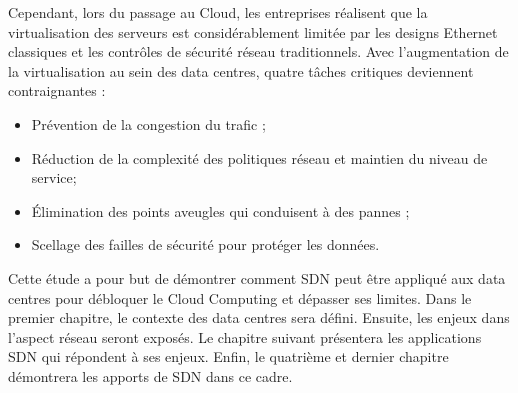 \par
Cependant, lors du passage au Cloud, les entreprises réalisent que la virtualisation des serveurs est considérablement limitée par les designs Ethernet classiques et les contrôles de sécurité réseau traditionnels. Avec l'augmentation de la virtualisation au sein des data centres, quatre tâches critiques deviennent contraignantes :
\begin{itemize}
\item Prévention de la congestion du trafic ;
\item Réduction de la complexité des politiques réseau et maintien du niveau de service;
\item Élimination des points aveugles qui conduisent à des pannes ;
\item  Scellage des failles de sécurité pour protéger les données.
\end{itemize}

\par
Cette étude a pour but de démontrer comment SDN peut être appliqué aux data centres pour débloquer le Cloud Computing et dépasser ses limites. Dans le premier chapitre, le contexte des data centres sera défini. Ensuite, les enjeux dans l'aspect réseau seront exposés. Le chapitre suivant présentera les applications SDN qui répondent à ses enjeux. Enfin, le quatrième et dernier chapitre démontrera les apports de SDN dans ce cadre.

